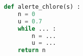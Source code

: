 \begin{center}
\begin{lstlisting}[language=python]
def alerte_chlore(s) :
	n = 0
	u = 0.7
	while ... :
		n = ...
		u = ...
	return n
\end{lstlisting}
\end{center}